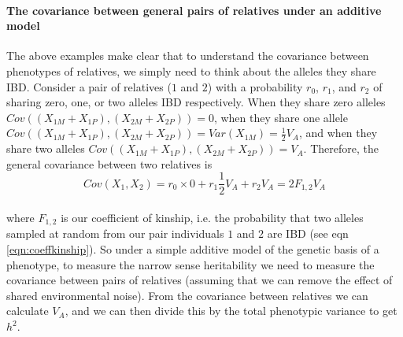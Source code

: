 


\paragraph{The covariance between general pairs of relatives under an
additive model}

The above examples make clear that to understand the covariance between
phenotypes of relatives, we simply need to think about the alleles they
share IBD. Consider a pair of relatives ($1$ and $2$) with a probability $r_0$,
$r_1$, and $r_2$ of sharing zero, one, or two alleles IBD
respectively. When they share zero alleles
$Cov((X_{1M}+X_{1P}),(X_{2M}+X_{2P}))=0$, when they share one allele
$Cov((X_{1M}+X_{1P}),(X_{2M}+X_{2P}))=
Var(X_{1M})=\frac{1}{2}V_A$, and when they share two alleles $Cov((X_{1M}+X_{1P}),(X_{2M}+X_{2P}))=
V_A$. Therefore, the general covariance between two
relatives is
\begin{equation}
Cov(X_1,X_2) = r_0 \times 0 + r_1 \frac{1}{2}V_A + r_2  V_A =
2 F_{1,2} V_A  \label{additive_covar_general_rellys}
\end{equation}\\
where $F_{1,2}$ is our coefficient of kinship, i.e. the probability that two alleles sampled at random
from our pair
individuals $1$ and $2$ are IBD (see eqn \eqref{eqn:coeffkinship}).
So under a simple additive model of the genetic basis of a phenotype,
to measure the narrow sense heritability we need to measure the
covariance between pairs of relatives (assuming that we can remove the effect of
shared environmental noise). From the covariance between relatives we
can calculate $V_A$, and we can then divide this by the total phenotypic
variance to get $h^2$. \\

